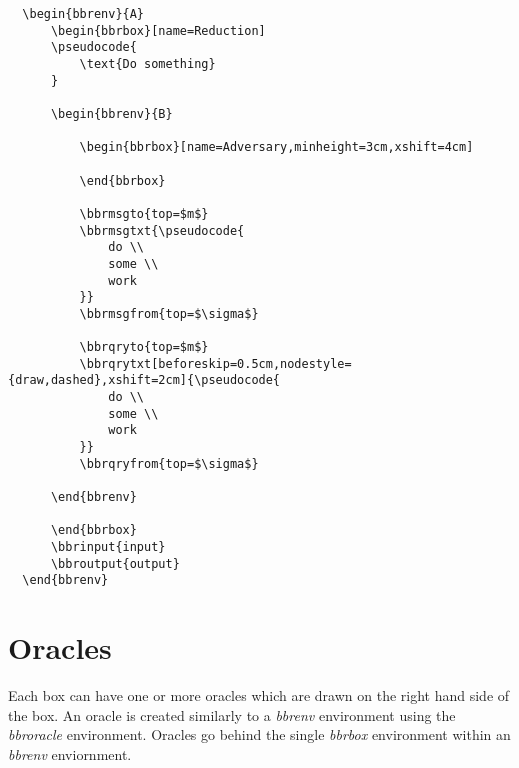 \documentclass[a4paper]{report}
\begin{document}
  \begin{lstlisting}
  \begin{bbrenv}{A}
	  \begin{bbrbox}[name=Reduction]
	  \pseudocode{
		  \text{Do something} 
	  }
  
	  \begin{bbrenv}{B}
  
		  \begin{bbrbox}[name=Adversary,minheight=3cm,xshift=4cm]
  
		  \end{bbrbox}
		  
		  \bbrmsgto{top=$m$}
		  \bbrmsgtxt{\pseudocode{
			  do \\
			  some \\
			  work
		  }}
		  \bbrmsgfrom{top=$\sigma$}
  
		  \bbrqryto{top=$m$}
		  \bbrqrytxt[beforeskip=0.5cm,nodestyle={draw,dashed},xshift=2cm]{\pseudocode{
			  do \\
			  some \\
			  work
		  }}
		  \bbrqryfrom{top=$\sigma$}
  
	  \end{bbrenv}
  
	  \end{bbrbox}
	  \bbrinput{input}
	  \bbroutput{output}
  \end{bbrenv}
  \end{lstlisting}
  
  \section{Oracles}
  Each box can have one or more oracles which are drawn on the right hand side of the box. An oracle
  is created similarly to a \emph{bbrenv} environment using the \emph{bbroracle} environment. Oracles
  go behind the single \emph{bbrbox} environment within an \emph{bbrenv} enviornment.
  
\end{document}
